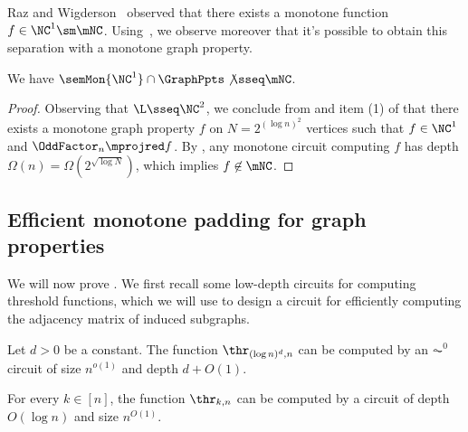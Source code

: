 \documentclass[11pt]{article}
\begin{document}
Raz and Wigderson~\cite{RW92} observed that there exists a monotone function
$f \in \NC^1 \sm \mNC$.
Using~,
we observe moreover that it's possible to obtain this separation
with a monotone graph property.

\begin{proposition}
    \label{prop:nc1-mnc-graph}
    We have $\semMon{\NC^1} \cap \GraphPpts \not\sseq \mNC$.
\end{proposition}
\begin{proof}
    Observing that $\L \sseq \NC^2$,
    we conclude 
    from
    and item (1) of 
    that
    there exists a monotone graph property $f$
    on 
    $N = 2^{(\log n)^2}$ 
    vertices
    such that 
    $f \in \NC^1$
    and 
    $\OddFactor_n \mprojred f$.
    By 
    ,
    any monotone circuit computing $f$
    has depth 
    $\Omega(n) = \Omega(2^{\sqrt{\log N}})$,
    which implies $f \not\in \mNC$.
    \qedhere
\end{proof}


\subsection{Efficient monotone padding for graph properties}

We will now prove .
We first recall some low-depth circuits
for computing threshold functions, which we will use to design a circuit for efficiently computing
the adjacency matrix of induced subgraphs.





\begin{theorem}
    \label{thm:polylog-thr-ac0}
Let $d > 0$ be a constant.
The function
$\thr_{(\log n)^d,n}$ 
can be computed by an $\AC^0$ circuit of size $n^{o(1)}$
and depth $d+O(1)$.
\end{theorem}

\begin{theorem}
    \label{thm:thr-nc1}
    For every $k \in [n]$,
    the function $\thr_{k,n}$ can be computed by a
    circuit of depth $O(\log n)$ and size
    $n^{O(1)}$.
\end{theorem}
\end{document}
